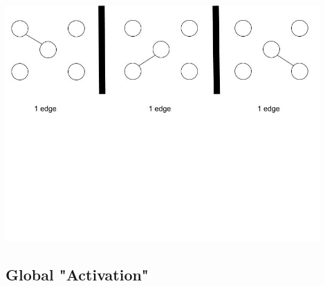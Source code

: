 \begin{center}
\includegraphics[trim={0 10cm 0 -1cm}, width=120mm]{./Figures/volatility3.jpg}
\end{center}








\subsection{Global "Activation"}




